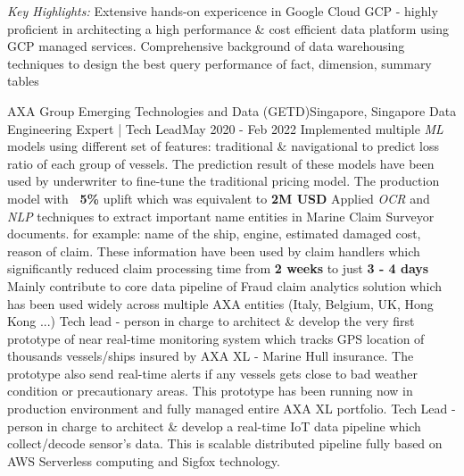       \emph{Key Highlights:}
      \resumeItemListStart
          {Extensive hands-on expericence in Google Cloud GCP - highly proficient in architecting a high performance \& cost efficient data platform using GCP managed services.}
          {Comprehensive background of data warehousing techniques to design the best query performance of fact, dimension, summary tables}
      \resumeItemListEnd

    \resumeSubheading
      {AXA Group Emerging Technologies and Data (GETD)}{Singapore, Singapore}
      {Data Engineering Expert | Tech Lead}{May 2020 - Feb 2022}
      \resumeItemListStart
          {Implemented multiple \emph{ML} models using different set of features: traditional \& navigational to predict loss ratio of each group of vessels. The prediction result of these models have been used by underwriter to fine-tune the traditional pricing model. The production model with \textbf{~5\%} uplift which was equivalent to \textbf{2M USD}}
          {Applied \emph{OCR} and \emph{NLP} techniques to extract important name entities in Marine Claim Surveyor documents. for example: name of the ship, engine, estimated damaged cost, reason of claim. These information have been used by claim handlers which significantly reduced claim processing time from \textbf{2 weeks} to just \textbf{3 - 4 days}}
          {Mainly contribute to core data pipeline of Fraud claim analytics solution which has been used widely across multiple AXA entities (Italy, Belgium, UK, Hong Kong ...)}
          {Tech lead - person in charge to architect \& develop the very first prototype of near real-time monitoring system which tracks GPS location of thousands vessels/ships insured by AXA XL - Marine Hull insurance. The prototype also send real-time alerts if any vessels gets close to bad weather condition or precautionary areas. This prototype has been running now in production environment and fully managed entire AXA XL portfolio.}
          {Tech Lead - person in charge to architect \& develop a real-time IoT data pipeline which collect/decode sensor’s data. This is scalable distributed pipeline fully based on AWS Serverless computing and Sigfox technology.}
      \resumeItemListEnd


